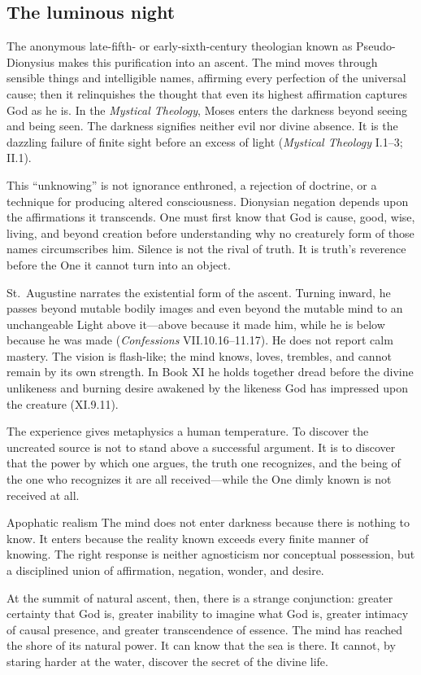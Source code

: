 \subsection{The luminous night}

The anonymous late-fifth- or early-sixth-century theologian known as Pseudo-Dionysius makes this purification into an ascent. The mind moves through sensible things and intelligible names, affirming every perfection of the universal cause; then it relinquishes the thought that even its highest affirmation captures God as he is. In the \emph{Mystical Theology}, Moses enters the darkness beyond seeing and being seen. The darkness signifies neither evil nor divine absence. It is the dazzling failure of finite sight before an excess of light (\emph{Mystical Theology} I.1--3; II.1).

This ``unknowing'' is not ignorance enthroned, a rejection of doctrine, or a technique for producing altered consciousness. Dionysian negation depends upon the affirmations it transcends. One must first know that God is cause, good, wise, living, and beyond creation before understanding why no creaturely form of those names circumscribes him. Silence is not the rival of truth. It is truth's reverence before the One it cannot turn into an object.

St.~Augustine narrates the existential form of the ascent. Turning inward, he passes beyond mutable bodily images and even beyond the mutable mind to an unchangeable Light above it---above because it made him, while he is below because he was made (\emph{Confessions} VII.10.16--11.17). He does not report calm mastery. The vision is flash-like; the mind knows, loves, trembles, and cannot remain by its own strength. In Book XI he holds together dread before the divine unlikeness and burning desire awakened by the likeness God has impressed upon the creature (XI.9.11).

The experience gives metaphysics a human temperature. To discover the uncreated source is not to stand above a successful argument. It is to discover that the power by which one argues, the truth one recognizes, and the being of the one who recognizes it are all received---while the One dimly known is not received at all.

\begin{studybox}{Apophatic realism}
The mind does not enter darkness because there is nothing to know. It enters because the reality known exceeds every finite manner of knowing. The right response is neither agnosticism nor conceptual possession, but a disciplined union of affirmation, negation, wonder, and desire.
\end{studybox}

At the summit of natural ascent, then, there is a strange conjunction: greater certainty that God is, greater inability to imagine what God is, greater intimacy of causal presence, and greater transcendence of essence. The mind has reached the shore of its natural power. It can know that the sea is there. It cannot, by staring harder at the water, discover the secret of the divine life.
